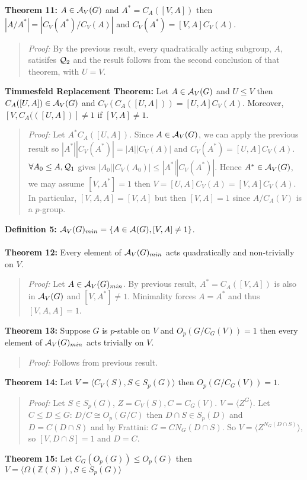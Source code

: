 {\bf Theorem 11:} 
$A \in {\cal A}_V(G)$ and $A^* = C_A([V,A])$ then 
$|A/A^*| = |C_V(A^*)/C_V(A)|$ and $C_V(A^*)= [V,A] C_V(A)$.
\begin{quote}
\emph{Proof:}  
By the previous result, every quadratically acting subgroup, $A$, satisifes
${\cal Q}_2$ and the result follows from the second conclusion of that theorem, with $U=V$.
\end{quote}
{\bf Timmesfeld Replacement Theorem:}  
Let $A \in {\cal A}_V(G)$ and $U \le V$ then $C_A([U,A]) \in {\cal A}_V(G)$ and
$C_V(C_A([U,A]))= [U,A] C_V(A)$.  Moreover,
$[V,C_A(([U,A])] \ne 1$ if $[V,A] \ne 1$.
\begin{quote}
\emph{Proof:}  
Let  $A^* C_A([U,A])$.  Since $A \in {\cal A}_V(G)$, we can apply the previous
result so
$|A^*| |C_V(A^*)| = |A| |C_V(A)|$ and $C_V(A^*)= [U,A] C_V(A)$.
$\forall A_0 \le A, {\cal Q}_1$ gives
$|A_0| |C_V(A_0)| \le |A^*| |C_V(A^*)|$.
Hence 
$A^* \in {\cal A}_V(G)$, we may assume $[V, A^*] =1$ then $V= [U,A] C_V(A)= [V,A] C_V(A)$.
In particular, $[V,A,A]=[V,A]$ but then $[V,A] = 1$ since $A/C_A(V)$ is a $p$-group.
\end{quote}
{\bf Definition 5:} ${\cal A}_V(G)_{min}= \{ A \in {\cal A}(G), [V,A] \ne 1 \}$.
\\
\\
{\bf Theorem 12:}  Every element of ${\cal A}_V(G)_{min}$ acts quadratically and non-trivially on
$V$.
\begin{quote}
\emph{Proof:}  
Let $A \in 
{\cal A}_V(G)_{min}$.  By previous result, $A^*= C_A([V,A])$ is also in
${\cal A}_V(G)$ and $[V, A^*] \ne 1$.  Minimality forces $A=A^*$ and thus
$[V,A,A]=1$.
\end{quote}
{\bf Theorem 13:}  Suppose $G$ is $p$-stable on $V$ and $O_p(G/C_G(V))=1$ then every element of
${\cal A}_V(G)_{min}$ acts trivially on $V$.
\begin{quote}
\emph{Proof:}  
Follows from previous result.
\end{quote}
{\bf Theorem 14:}
Let $V= \langle C_V(S), S \in S_p(G) \rangle $ then $O_p(G/C_G(V))=1$.
\begin{quote}
\emph{Proof:}  
Let $S \in S_p(G)$, $Z= C_V(S), C= C_G(V)$.  $V= \langle Z^G \rangle $.  Let $C \le D \le G$:
$D/C \cong O_p(G/C)$ then $D \cap S \in S_p(D)$ and $D= C(D \cap S)$ and by
Frattini: $G=C N_G(D \cap S)$.  So $V= \langle Z^{N_G(D \cap S)} \rangle $, so $[V, D \cap S]= 1$
and $D=C$.
\end{quote}
{\bf Theorem 15:}
Let $C_G(O_p(G)) \le O_p(G)$ then $V= \langle \Omega({\mathbb Z}(S)), S \in S_p(G) \rangle $ 
